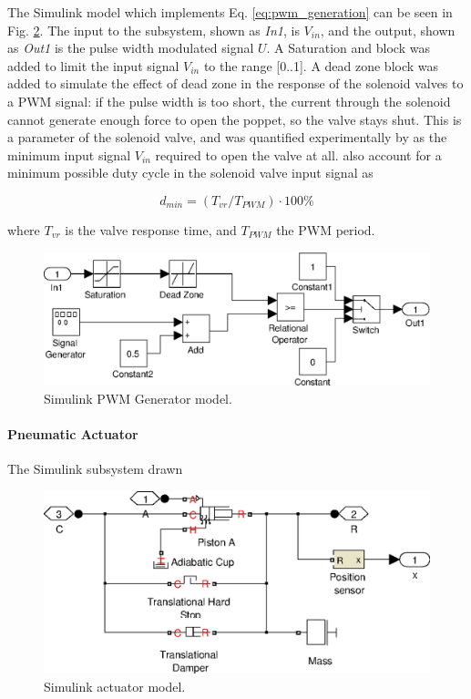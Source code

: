 The Simulink model which implements Eq. \ref{eq:pwm_generation} can be seen in Fig. \ref{fig:pneumatics_pwm}. The input to the subsystem, shown as \emph{In1}, is $V_{in}$, and the output, shown as \emph{Out1} is the pulse width modulated signal $U$. A Saturation and block was added to limit the input signal $V_{in}$ to the range [0..1]. A dead zone block was added to simulate the effect of dead zone in the response of the solenoid valves to a PWM signal: if the pulse width is too short, the current through the solenoid cannot generate enough force to open the poppet, so the valve stays shut. This is a parameter of the solenoid valve, and was quantified experimentally by \cite{valve_models} as the minimum input signal $V_{in}$ required to open the valve at all.  also account for a minimum possible duty cycle in the solenoid valve input signal as

\begin{equation}
  \label{eq:pwm_duty_min}
  d_{min}=\left(T_{vr}/T_{PWM}\right)\cdot100\%
\end{equation}

where $T_{vr}$ is the valve response time, and $T_{PWM}$ the PWM period.


\begin{figure}[h]
\centering
\includegraphics[scale=1]{implementation/figures/pneumatic_modelling2.eps}
\caption{Simulink PWM Generator model.}
\label{fig:pneumatics_pwm}
\end{figure}

\paragraph{Pneumatic Actuator}

The Simulink subsystem drawn

\begin{figure}[h]
\centering
\includegraphics[scale=1]{implementation/figures/pneumatic_modelling3}
\caption{Simulink actuator model.}
\label{fig:pneumatics_pwm}
\end{figure}

